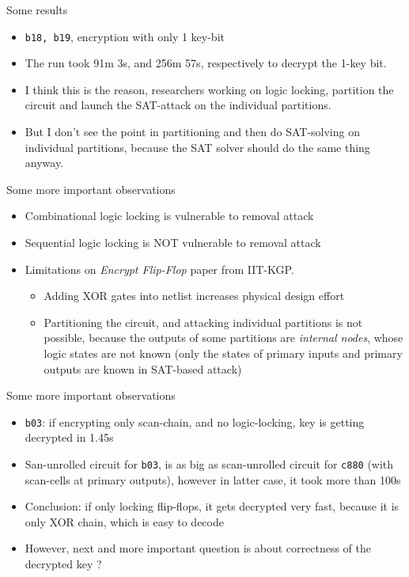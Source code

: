 \begin{frame}{Some results}
	\begin{itemize}
		\item \texttt{b18, b19}, encryption with \alert{only 1 key-bit}
		\item The run took 91m 3s, and 256m 57s, respectively to decrypt the 1-key bit. 
		\item I think this is the reason, researchers working on logic locking, partition the circuit and launch the SAT-attack on the individual partitions. 
		\item But I don't see the point in partitioning and then do SAT-solving on individual partitions, because the SAT solver should do the same thing anyway. 
	\end{itemize}
\end{frame}

\begin{frame}{Some more important observations}
	\begin{itemize}
		\item Combinational logic locking is vulnerable to removal attack
		\item Sequential logic locking is \alert{NOT} vulnerable to removal attack
		\item Limitations on {\it Encrypt Flip-Flop} paper from IIT-KGP. 
			\begin{itemize}
				\item Adding XOR gates into netlist increases physical design effort
				\item Partitioning the circuit, and attacking individual partitions is not possible, because the outputs of some partitions are {\it internal nodes}, whose logic states are not known (only the states of primary inputs and primary outputs are known in SAT-based attack)
			\end{itemize}
	\end{itemize}
\end{frame}

\begin{frame}{Some more important observations}
	\begin{itemize}
		\item \texttt{b03}: if encrypting only scan-chain, and no logic-locking, key is getting decrypted in 1.45s
		\item San-unrolled circuit for \texttt{b03}, is as big as scan-unrolled circuit for \texttt{c880} (with scan-cells at primary outputs), however in latter case, it took more than 100s
		\item Conclusion: if only locking flip-flops, it gets decrypted very fast, because it is only XOR chain, which is easy to decode
		\item However, next and more important question is about correctness of the decrypted key ?
	\end{itemize}
\end{frame}

